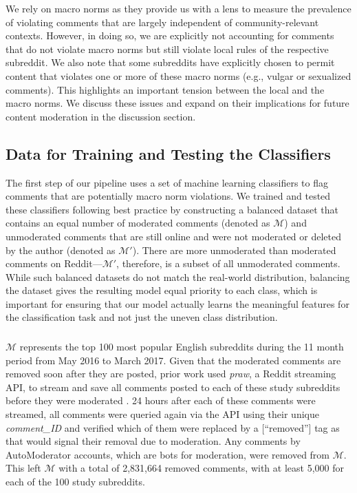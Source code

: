 We rely on macro norms as they provide us with a lens to measure the prevalence of violating comments that are largely independent of community-relevant contexts. However, in doing so, we are explicitly not accounting for comments that do not violate macro norms but still violate local rules of the respective subreddit. We also note that some subreddits have explicitly chosen to permit content that violates one or more of these macro norms (e.g., vulgar or sexualized comments). This highlights an important tension between the local and the macro norms. We discuss these issues and expand on their implications for future content moderation in the discussion section.


\subsection{Data for Training and Testing the Classifiers}
The first step of our pipeline uses a set of machine learning classifiers to flag comments that are potentially macro norm violations. We trained and tested these classifiers following best practice by constructing a balanced dataset that contains an equal number of moderated comments (denoted as $\mathcal{M}$) and unmoderated comments that are still online and were not moderated or deleted by the author (denoted as $\mathcal{M'}$). There are more unmoderated than moderated comments on Reddit---$\mathcal{M'}$, therefore, is a subset of all unmoderated comments. While such balanced datasets do not match the real-world distribution, balancing the dataset gives the resulting model equal priority to each class, which is important for ensuring that our model actually learns the meaningful features for the classification task and not just the uneven class distribution. 

\subsubsection{} 
$\mathcal{M}$ represents the top 100 most popular English subreddits during the 11 month period from May 2016 to March 2017. Given that the moderated comments are removed soon after they are posted, prior work used \textit{praw}, a Reddit streaming API, to stream and save all comments posted to each of these study subreddits before they were moderated \cite{Chandrasekharan2018internet}. 24 hours after each of these comments were streamed, all comments were queried again via the API using their unique \textit{comment\_ID} and verified which of them were replaced by a [``removed''] tag as that would signal their removal due to moderation. Any comments by AutoModerator accounts, which are bots for moderation, were removed from $\mathcal{M}$. This left $\mathcal{M}$ with a total of 2,831,664 removed comments, with at least 5,000 for each of the 100 study subreddits. 


